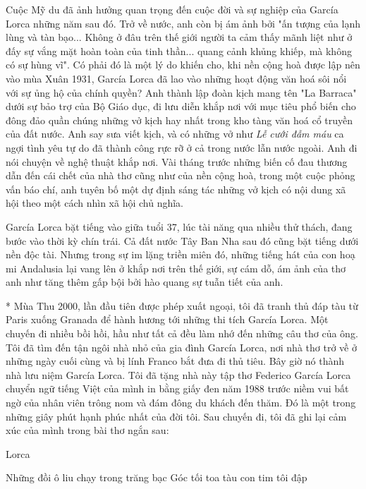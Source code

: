 \documentclass[../main.tex]{subfiles}
\begin{document}
\begin{multicols}{2}
Cuộc Mỹ du đã ảnh hưởng quan trọng đến cuộc đời và sự nghiệp của García Lorca những năm sau đó. Trở về nước, anh còn bị ám ảnh bởi "ấn tượng của lạnh lùng và tàn bạo... Không ở đâu trên thế giới người ta cảm thấy mãnh liệt như ở đấy sự vắng mặt hoàn toàn của tinh thần... quang cảnh khủng khiếp, mà không có sự hùng vĩ". Có phải đó là một lý do khiến cho, khi nền cộng hoà được lập nên vào mùa Xuân 1931, García Lorca đã lao vào những hoạt động văn hoá sôi nổi với sự ủng hộ của chính quyền? Anh thành lập đoàn kịch mang tên "La Barraca" dưới sự bảo trợ của Bộ Giáo dục, đi lưu diễn khắp nơi với mục tiêu phổ biến cho đông đảo quần chúng những vở kịch hay nhất trong kho tàng văn hoá cổ truyền của đất nước. Anh say sưa viết kịch, và có những vở như \textit{Lễ cưới đẫm máu} ca ngợi tình yêu tự do đã thành công rực rỡ ở cả trong nước lẫn nước ngoài. Anh đi nói chuyện về nghệ thuật khắp nơi. Vài tháng trước những biến cố đau thương dẫn đến cái chết của nhà thơ cũng như của nền cộng hoà, trong một cuộc phỏng vấn báo chí, anh tuyên bố một dự định sáng tác những vở kịch có nội dung xã hội theo một cách nhìn xã hội chủ nghĩa. 
 
García Lorca bặt tiếng vào giữa tuổi 37, lúc tài năng qua nhiều thử thách, đang bước vào thời kỳ chín trái. Cả đất nước Tây Ban Nha sau đó cũng bặt tiếng dưới nền độc tài. Nhưng trong sự im lặng triền miên đó, những tiếng hát của con hoạ mi Andalusia lại vang lên ở khắp nơi trên thế giới, sự cám dỗ, ám ảnh của thơ anh như tăng thêm gấp bội bởi hào quang sự tuẫn tiết của anh. 
        
*    
Mùa Thu 2000, lần đầu tiên được phép xuất ngoại, tôi đã tranh thủ đáp tàu từ Paris xuống Granada để hành hương tới những thi tích García Lorca. Một chuyến đi nhiều bồi hồi, hầu như tất cả đều làm nhớ đến những câu thơ của ông. Tôi đã tìm đến tận ngôi nhà nhỏ của gia đình García Lorca, nơi nhà thơ trở về ở những ngày cuối cùng và bị lính Franco bắt đưa đi thủ tiêu. Bây giờ nó thành nhà lưu niệm García Lorca. Tôi đã tặng nhà này tập thơ Federico García Lorca chuyển ngữ tiếng Việt của mình in bằng giấy đen năm 1988 trước niềm vui bất ngờ của nhân viên trông nom và đám đông du khách đến thăm. Đó là một trong những giây phút hạnh phúc nhất của đời tôi. Sau chuyến đi, tôi đã ghi lại cảm xúc của mình trong bài thơ ngắn sau: 
\begin{blockquote}
        
Lorca 
        
Những đồi ô liu chạy trong trăng bạc        
Góc tối toa tàu con tim tôi đập 
        

\end{blockquote}
\end{multicols}
\end{document}
